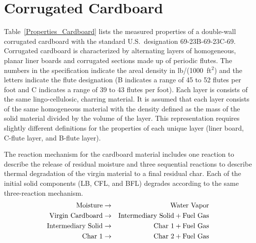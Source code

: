 \clearpage

\section{Corrugated Cardboard}
\label{Cardboard}

Table~\ref{Properties_Cardboard} lists the measured properties of a double-wall corrugated cardboard with the standard U.S.~designation 69-23B-69-23C-69. Corrugated cardboard is characterized by alternating layers of homogeneous, planar liner boards and corrugated sections made up of periodic flutes. The numbers in the specification indicate the areal density in lb/(1000~ft$^2$) and the letters indicate the flute designation (B indicates a range of 45 to 52 flutes per foot and C indicates a range of 39 to 43 flutes per foot). Each layer is consists of the same lingo-cellulosic, charring material. It is assumed that each layer consists of the same homogeneous material with the density defined as the mass of the solid material divided by the volume of the layer. This representation requires slightly different definitions for the properties of each unique layer (liner board, C-flute layer, and B-flute layer).

The reaction mechanism for the cardboard material includes one reaction to describe the release of residual moisture and three sequential reactions to describe thermal degradation of the virgin material to a final residual char. Each of the initial solid components (LB, CFL, and BFL) degrades according to the same three-reaction mechanism.
\begin{eqnarray}
   \hbox{Moisture} &\to& \hbox{Water Vapor}  \\
   \hbox{Virgin Cardboard}  &\to& \hbox{Intermediary Solid} + \hbox{Fuel Gas}  \\
   \hbox{Intermediary Solid}  &\to& \hbox{Char 1} + \hbox{Fuel Gas}  \\
   \hbox{Char 1}  &\to& \hbox{Char 2} + \hbox{Fuel Gas}
\end{eqnarray}

